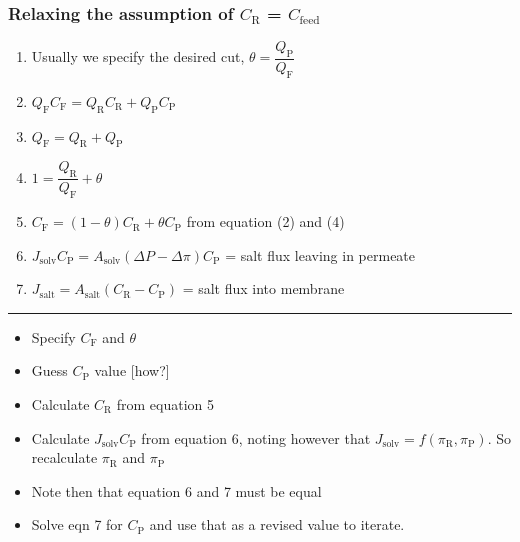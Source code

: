\begin{frame}\frametitle{Relaxing the assumption of $C_\text{R}$ = $C_\text{feed}$}
	\begin{enumerate}
		\item	Usually we specify the desired cut, $\theta = \dfrac{Q_\text{P}}{Q_\text{F}}$
		\item	$Q_\text{F} C_\text{F} = Q_\text{R} C_\text{R} + Q_\text{P} C_\text{P}$
		\item	$Q_\text{F} = Q_\text{R} + Q_\text{P}$
		\item	$1 = \dfrac{Q_\text{R}}{Q_\text{F}} + \theta$
		\item	$C_\text{F} = (1 - \theta)C_\text{R} + \theta C_\text{P}$ from equation (2) and (4)
		\item	$J_\text{solv}C_\text{P} = A_\text{solv}(\Delta P - \Delta \pi)C_\text{P}$ = salt flux leaving in permeate
		\item	$J_\text{salt} = A_\text{salt}(C_\text{R} - C_\text{P})$ = salt flux into membrane
	\end{enumerate}
	\hrule
	\begin{itemize}
		\item	Specify $C_\text{F}$ and $\theta$
		\item	Guess $C_\text{P}$ value [how?]
		\item	Calculate $C_\text{R}$ from equation 5
		\item	Calculate $J_\text{solv} C_\text{P}$ from equation 6, noting however that $J_\text{solv} = f(\pi_\text{R}, \pi_\text{P})$. So recalculate $\pi_\text{R}$ and $\pi_\text{P}$
		\item	Note then that equation 6 and 7 must be equal
		\item	Solve eqn 7 for $C_\text{P}$ and use that as a revised value to iterate.
	\end{itemize}
\end{frame}
